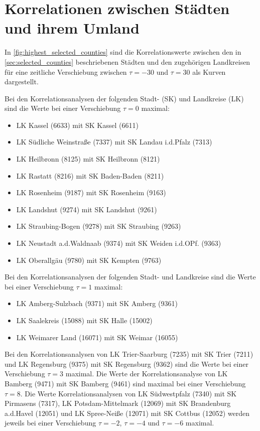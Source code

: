 \newpage
\section{Korrelationen zwischen Städten und ihrem Umland}
In \autoref{fig:highest_selected_counties} sind die Korrelationswerte zwischen den in  \autoref{sec:selected_counties} beschriebenen Städten und den zugehörigen Landkreisen für eine zeitliche Verschiebung zwischen $\tau=-30$ und $\tau=30$ als Kurven dargestellt. 

Bei den Korrelationsanalysen der folgenden Stadt- (SK) und Landkreise (LK) sind die Werte bei einer Verschiebung $\tau=0$ maximal:
\begin{itemize}
    \item LK Kassel (6633) mit SK Kassel (6611)
    \item LK Südliche Weinstraße (7337) mit SK Landau i.d.Pfalz (7313)
    \item LK Heilbronn (8125) mit SK Heilbronn (8121)
    \item LK Rastatt (8216) mit SK Baden-Baden (8211)
    \item LK Rosenheim (9187) mit SK Rosenheim (9163)
    \item LK Landshut (9274) mit SK Landshut (9261)
    \item LK Straubing-Bogen (9278) mit SK Straubing (9263)
    \item LK Neustadt a.d.Waldnaab (9374) mit SK Weiden i.d.OPf. (9363)
    \item LK Oberallgäu (9780) mit SK Kempten (9763)
\end{itemize}
Bei den Korrelationsanalysen der folgenden Stadt- und Landkreise sind die Werte bei einer Verschiebung $\tau=1$ maximal:
\begin{itemize}
    \item LK Amberg-Sulzbach (9371) mit SK Amberg (9361)
    \item LK Saalekreis (15088) mit SK Halle (15002)
    \item LK Weimarer Land (16071) mit SK Weimar (16055)
\end{itemize}
Bei den Korrelationsanalysen von LK Trier-Saarburg (7235) mit SK Trier (7211) und LK Regensburg (9375) mit SK Regensburg (9362) sind die Werte bei einer Verschiebung $\tau=3$ maximal. Die Werte der Korrelationsanalyse von LK Bamberg (9471) mit SK Bamberg (9461) sind maximal bei einer Verschiebung $\tau=8$.
Die Werte Korrelationsanalysen von LK Südwestpfalz (7340) mit SK Pirmasens (7317), LK Potsdam-Mittelmark (12069) mit SK Brandenburg a.d.Havel (12051) und LK Spree-Neiße (12071) mit SK Cottbus (12052) werden jeweils bei einer Verschiebung $\tau=-2$, $\tau=-4$ und $\tau=-6$ maximal.
